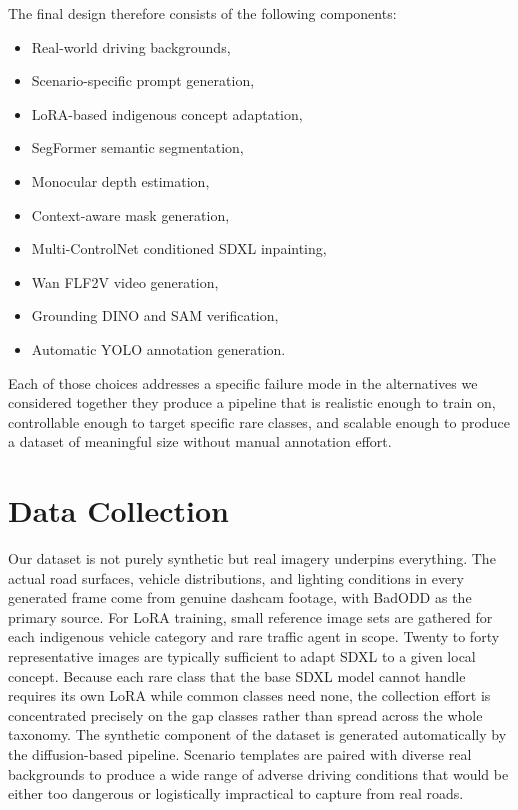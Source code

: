 The final design therefore consists of the following components:

\begin{itemize}
    \item Real-world driving backgrounds,
    \item Scenario-specific prompt generation,
    \item LoRA-based indigenous concept adaptation,
    \item SegFormer\cite{xie2021segformer} semantic segmentation,
    \item Monocular depth estimation,
    \item Context-aware mask generation,
    \item Multi-ControlNet conditioned SDXL inpainting,
    \item Wan FLF2V video generation,
    \item Grounding DINO\cite{liu2024groundingdino} and SAM verification,
    \item Automatic YOLO annotation generation.
\end{itemize}

Each of those choices addresses a specific failure mode in the alternatives we considered together they produce a pipeline that is realistic enough to train on, controllable enough to target specific rare classes, and scalable enough to produce a dataset of meaningful size without manual annotation effort.\\


\section{Data Collection }

Our dataset is not purely synthetic but real imagery underpins everything. The actual road surfaces, vehicle distributions, and lighting conditions in every generated frame come from genuine dashcam footage, with BadODD\cite{saha2024bnvd} as the primary source.
For LoRA training, small reference image sets are gathered for each indigenous vehicle category and rare traffic agent in scope. Twenty to forty representative images are typically sufficient to adapt SDXL to a given local concept. Because each rare class that the base SDXL model cannot handle requires its own LoRA while common classes need none, the collection effort is concentrated precisely on the gap classes rather than spread across the whole taxonomy.
The synthetic component of the dataset is generated automatically by the diffusion-based pipeline. Scenario templates are paired with diverse real backgrounds to produce a wide range of adverse driving conditions that would be either too dangerous or logistically impractical to capture from real roads.


